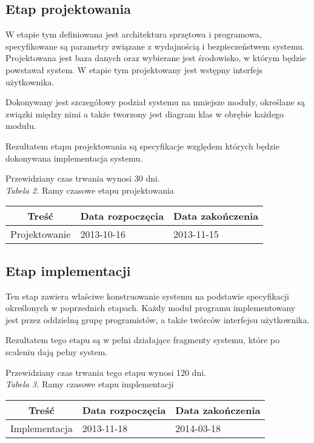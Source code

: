 \documentclass [11pt, a4paper, leqno]	{article}	%
\begin{document}
\subsection{Etap projektowania}
\noindent
W etapie tym definiowana jest architektura sprzętowa i programowa, specyfikowane są parametry związane z wydajnością i bezpieczeństwem systemu. Projektowana jest baza danych oraz wybierane jest środowisko, w którym będzie powstawał system. W etapie tym projektowany jest wstępny interfejs użytkownika. 

Dokonywany jest szczegółowy podział systemu na mniejsze moduły, określane są związki między nimi a także tworzony jest diagram klas w obrębie każdego modułu.

Rezultatem etapu projektowania są specyfikacje względem których będzie dokonywana implementacja systemu. 

Przewidziany czas trwania wynosi 30 dni. \\

\textit{Tabela 2.} Ramy czasowe etapu projektowania

\begin{center}
	\begin{tabular}{| l | l | l |}
		\hline
		\multicolumn{1}{|c|}{Treść} & 
		\multicolumn{1}{|c|}{Data rozpoczęcia} & 
		\multicolumn{1}{|c|}{Data zakończenia} \\ \hline \hline
		Projektowanie & 2013-10-16 & 2013-11-15 \\ \hline
	\end{tabular}
\end{center}

\subsection{Etap implementacji}
\noindent
Ten etap zawiera właściwe konstruowanie systemu na podstawie specyfikacji określonych w poprzednich etapach. Każdy moduł programu implementowany jest przez oddzielną grupę programistów, a także twórców interfejsu użytkownika. 

Rezultatem tego etapu są w pełni działające fragmenty systemu, które po scaleniu dają pełny system.

Przewidziany czas trwania tego etapu wynosi 120 dni. \\

\textit{Tabela 3.} Ramy czasowe etapu implementacji

\begin{center}
	\begin{tabular}{| l | l | l |}
		\hline
		\multicolumn{1}{|c|}{Treść} & 
		\multicolumn{1}{|c|}{Data rozpoczęcia} & 
		\multicolumn{1}{|c|}{Data zakończenia} \\ \hline \hline
		Implementacja & 2013-11-18 & 2014-03-18 \\ \hline
	\end{tabular}
\end{center}
\end{document}
